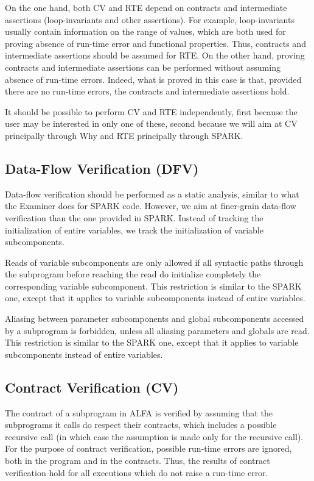 \documentclass{article}
\newcounter{example}
\begin{document}
On the one hand, both CV and RTE depend on contracts and intermediate
assertions (loop-invariants and other assertions). For example, loop-invariants
usually contain information on the range of values, which are both used for
proving absence of run-time error and functional properties. Thus, contracts
and intermediate assertions should be assumed for RTE. On the other hand,
proving contracts and intermediate assertions can be performed without assuming
absence of run-time errors. Indeed, what is proved in this case is that,
provided there are no run-time errors, the contracts and intermediate
assertions hold.

It should be possible to perform CV and RTE independently, first because the
user may be interested in only one of these, second because we will aim at CV
principally through Why and RTE principally through SPARK.

\subsection{Data-Flow Verification (DFV)}
\label{sub:DFV}

Data-flow verification should be performed as a static analysis, similar to
what the Examiner does for SPARK code. However, we aim at finer-grain data-flow
verification than the one provided in SPARK. Instead of tracking the
initialization of entire variables, we track the initialization of variable
subcomponents.

Reads of variable subcomponents are only allowed if all syntactic paths through
the subprogram before reaching the read do initialize completely the
corresponding variable subcomponent. This restriction is similar to the SPARK
one, except that it applies to variable subcomponents instead of entire
variables.

Aliasing between parameter subcomponents and global subcomponents accessed by
a subprogram is forbidden, unless all aliasing parameters and globals are
read. This restriction is similar to the SPARK one, except that it applies to
variable subcomponents instead of entire variables.

\subsection{Contract Verification (CV)}

The contract of a subprogram in ALFA is verified by assuming that the
subprograms it calls do respect their contracts, which includes a possible
recursive call (in which case the assumption is made only for the recursive
call). For the purpose of contract verification, possible run-time errors are
ignored, both in the program and in the contracts. Thus, the results of
contract verification hold for all executions which do not raise a run-time
error.
\end{document}
